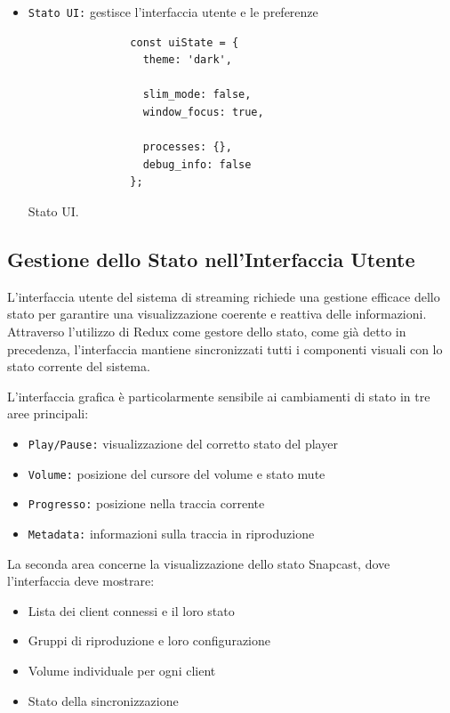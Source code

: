 \begin{itemize}
    \item \texttt{Stato UI:} gestisce l'interfaccia utente e le preferenze

          \begin{table}[H]
            \begin{minipage}{0.35\textwidth}
              \begin{verbatim}
                const uiState = {
                  theme: 'dark',
          
                  slim_mode: false,
                  window_focus: true,
          
                  processes: {},
                  debug_info: false
                };
              \end{verbatim}
            \end{minipage}
            \caption{Stato UI.}
            \label{tab:stato_ui}
          \end{table}
\end{itemize}

\subsection{Gestione dello Stato nell'Interfaccia Utente}

L'interfaccia utente del sistema di streaming richiede una gestione efficace dello stato per garantire una visualizzazione coerente e reattiva delle informazioni. Attraverso l'utilizzo di Redux come gestore dello stato, come già detto in precedenza, l'interfaccia mantiene sincronizzati tutti i componenti visuali con lo stato corrente del sistema.

L'interfaccia grafica è particolarmente sensibile ai cambiamenti di stato in tre aree principali:

\begin{itemize}
    \item \texttt{Play/Pause:} visualizzazione del corretto stato del player
    \item \texttt{Volume:} posizione del cursore del volume e stato mute
    \item \texttt{Progresso:} posizione nella traccia corrente
    \item \texttt{Metadata:} informazioni sulla traccia in riproduzione
\end{itemize}

La seconda area concerne la visualizzazione dello stato Snapcast, dove l'interfaccia deve mostrare:

\begin{itemize}
    \item Lista dei client connessi e il loro stato
    \item Gruppi di riproduzione e loro configurazione
    \item Volume individuale per ogni client
    \item Stato della sincronizzazione
\end{itemize}

